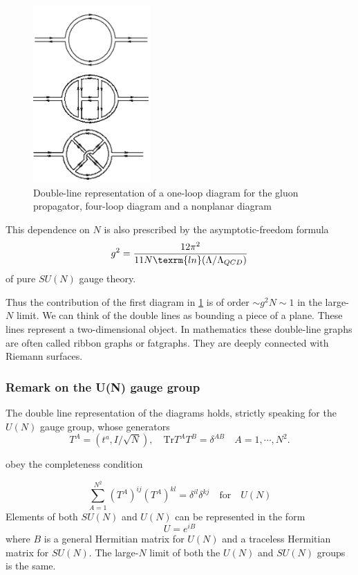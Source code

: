 \begin{figure}
\includegraphics[width=0.4\textwidth]{Images/figurefull.png}
\caption{Double-line representation of a one-loop diagram for the gluon
propagator, four-loop diagram and a nonplanar diagram}
\label{fig:nonplanardiagrams}
\end{figure}
This dependence on $N$ is also prescribed by the asymptotic-freedom formula
\begin{equation}
  g^2 = \frac{12\pi^2}{11N \texrm{ln}(\Lambda/\Lambda_{QCD})}
\end{equation}
of pure $SU(N)$ gauge theory.
\par Thus the contribution of the first diagram in \ref{fig:nonplanardiagrams}
is of order $\sim g^2N\sim 1$ in the large-$N$ limit.
We can think of the double lines as bounding a piece of a plane. These lines
represent a two-dimensional object. In mathematics these double-line graphs are
often called ribbon graphs or fatgraphs. They are deeply connected with Riemann
surfaces.
\subsubsection{Remark on the U(N) gauge group}
The double line representation of the diagrams holds, strictly speaking for the
$U(N)$ gauge group, whose generators
\begin{equation}
  T^A = (t^a, I/\sqrt{N}),\quad \mathrm{Tr}T^AT^B
  = \delta^{AB}\quad\boxed{A=1,\cdots,N^2}.
\end{equation}

obey the completeness condition

\begin{equation}
  \sum_{A=1}^{N^2}(T^A)^{ij}(T^A)^{kl}
  = \delta^{il}\delta^{kj}\quad\boxed{\mathrm{for}\quad U(N)}
\end{equation}
Elements of both $SU(N)$ and $U(N)$ can be represented in the form
\begin{equation}
  U = e^{iB}
\end{equation}
where $B$ is a general Hermitian matrix for $U(N)$ and a traceless Hermitian
matrix for $SU(N)$. The large-$N$ limit of both the $U(N)$ and $SU(N)$ groups
is the same.
